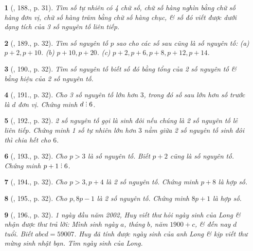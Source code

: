\documentclass{article}
\newtheorem{baitoan}{}
\DeclareRobustCommand{\divby}{%
	\mathrel{\vbox{\baselineskip.65ex\lineskiplimit0pt\hbox{.}\hbox{.}\hbox{.}}}%
}
\begin{document}
\begin{baitoan}[\cite{Binh_Toan_6_tap_1}, 188., p. 31]
	Tìm số tự nhiên có 4 chữ số, chữ số hàng nghìn bằng chữ số hàng đơn vị, chữ số hàng trăm bằng chữ số hàng chục, \& số đó viết được dưới dạng tích của 3 số nguyên tố liên tiếp.
\end{baitoan}

\begin{baitoan}[\cite{Binh_Toan_6_tap_1}, 189., p. 32]
	Tìm số nguyên tố $p$ sao cho các số sau cũng là số nguyên tố: (a) $p + 2,p + 10$. (b) $p + 10,p + 20$. (c) $p + 2,p + 6,p + 8,p + 12,p + 14$.
\end{baitoan}

\begin{baitoan}[\cite{Binh_Toan_6_tap_1}, 190., p. 32]
	Tìm số nguyên tố biết số đó bằng tổng của 2 số nguyên tố \& bằng hiệu của 2 số nguyên tố.
\end{baitoan}

\begin{baitoan}[\cite{Binh_Toan_6_tap_1}, 191., p. 32]
	Cho 3 số nguyên tố lớn hơn $3$, trong đó số sau lớn hơn số trước là $d$ đơn vị. Chứng minh $d\divby6$.
\end{baitoan}

\begin{baitoan}[\cite{Binh_Toan_6_tap_1}, 192., p. 32]
	2 số nguyên tố gọi là {\rm sinh đôi} nếu chúng là 2 số nguyên tố lẻ liên tiếp. Chứng minh 1 số tự nhiên lớn hơn $3$ nằm giữa 2 số nguyên tố sinh đôi thì chia hết cho $6$.
\end{baitoan}

\begin{baitoan}[\cite{Binh_Toan_6_tap_1}, 193., p. 32]
	Cho $p > 3$ là số nguyên tố. Biết $p + 2$ cũng là số nguyên tố. Chứng minh $p + 1\divby6$.
\end{baitoan}

\begin{baitoan}[\cite{Binh_Toan_6_tap_1}, 194., p. 32]
	Cho $p > 3,p + 4$ là 2 số nguyên tố. Chứng minh $p + 8$ là hợp số.
\end{baitoan}

\begin{baitoan}[\cite{Binh_Toan_6_tap_1}, 195., p. 32]
	Cho $p,8p - 1$ là 2 số nguyên tố. Chứng minh $8p + 1$ là hợp số.
\end{baitoan}

\begin{baitoan}[\cite{Binh_Toan_6_tap_1}, 196., p. 32]
	1 ngày đầu năm 2002, Huy viết thư hỏi ngày sinh của Long \& nhận được thư trả lời: Mình sinh ngày $a$, tháng $b$, năm $1900 + c$, \& đến nay $d$ tuổi. Biết $abcd = 59007$. Huy đã tính được ngày sinh của anh Long \& kịp viết thư mừng sinh nhật bạn. Tìm ngày sinh của Long.
\end{baitoan}
\end{document}
